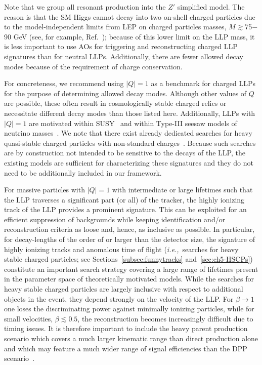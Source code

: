 Note that we group all resonant production into the $Z'$ simplified model.
The reason is that the SM Higgs cannot decay into two on-shell charged particles due to the model-independent limits from LEP on charged particles masses, $M\gtrsim$75$-$90 GeV (see, for example, Ref.~\cite{Abbiendi:2003yd}); because of this lower limit on the LLP mass, it is less important to use AOs for triggering and reconstructing charged LLP signatures than for neutral LLPs.
Additionally, there are fewer allowed decay modes because of the requirement of charge conservation. 

For concreteness, we recommend using $|Q|=1$ as a benchmark for charged LLPs for the purpose of determining allowed decay modes.
Although other values of $Q$ are possible, these often result in cosmologically stable charged relics or necessitate different decay modes than those listed here.
Additionally, LLPs with $|Q|=1$ are motivated within SUSY~\cite{Chen:1995yu,Thomas:1998wy,Feng:1999fu,Jittoh:2005pq,Brandenburg:2005he,Heisig:2013rya} and within Type-III seesaw models of neutrino masses~\cite{Bajc:2006ia,Bajc:2007zf,Franceschini:2008pz,Arhrib:2009mz}.
We note that there exist already dedicated searches for heavy quasi-stable charged particles with non-standard charges~\cite{Aad:2015kta,Khachatryan:2016sfv}.
Because such searches are by construction not intended to be sensitive to the decays of the LLP, the existing models are sufficient for characterizing these signatures and they do not need to be additionally included in our framework.

For massive particles with $|Q|=1$ with intermediate or large lifetimes such that the LLP traverses a significant part (or all) of the tracker, the highly ionizing track of the LLP provides a prominent signature.
This can be exploited for an efficient suppression of backgrounds while keeping identification and/or reconstruction criteria as loose and, hence, as inclusive as possible.
In particular, for decay-lengths of the order of or larger than the detector size, the signature of highly ionizing tracks and anomalous time of flight (\emph{i.e.,}~searches for heavy stable charged particles; see Sections~\ref{subsec:funnytracks} and~\ref{sec:ch5-HSCPs}) constitute an important search strategy covering a large range of lifetimes present in the parameter space of theoretically motivated models.
While the searches for heavy stable charged particles are largely inclusive with respect to additional objects in the event, they depend strongly on the velocity of the LLP\@.
For $\beta\to1$ one loses the discriminating power against minimally ionizing particles, while for small velocities, $\beta\lesssim0.5$, the reconstruction becomes increasingly difficult due to timing issues.
It is therefore important to include the heavy parent production scenario which covers a much larger kinematic range than direct production alone and which may feature a much wider range of signal efficiencies than the DPP scenario~\cite{Heisig:2015yla}.

